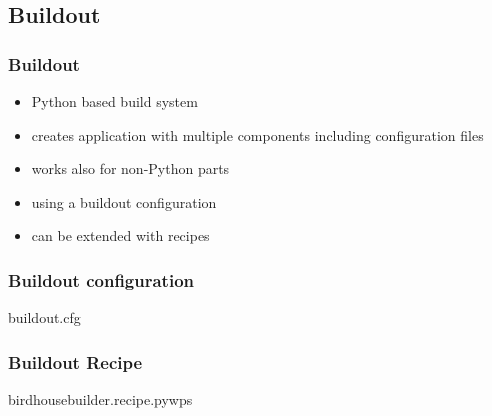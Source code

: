 \documentclass{beamer}
\begin{document}

  \subsection{Buildout}


  \begin{frame}
    \frametitle{Buildout}
    \begin{itemize}
      \item Python based build system
      \item creates application with multiple components including configuration files
      \item works also for non-Python parts
      \item using a buildout configuration 
      \item can be extended with recipes
    \end{itemize}
  \end{frame}


  \begin{frame}[fragile]
    \frametitle{Buildout configuration}
    \begin{block}{buildout.cfg}
      
    \end{block}
\end{frame}


  \begin{frame}[fragile]
    \frametitle{Buildout Recipe}
    \begin{block}{birdhousebuilder.recipe.pywps}
      
    \end{block}
\end{frame}

\end{document}
